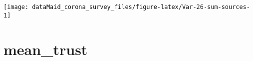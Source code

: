 \documentclass[
]{report}
\begin{document}
\begin{minipage}{0.75 \textwidth}
\end{minipage}
\begin{minipage}{0.25 \textwidth}

\begin{center}\texttt{[image: dataMaid\_corona\_survey\_files/figure-latex/Var-26-sum-sources-1]} \end{center}

\end{minipage}

\noindent\makebox[\linewidth]{\rule{\textwidth}{0.4pt}}

\hypertarget{mean_trust}{%
\section{mean\_trust}\label{mean_trust}}

\begin{minipage}{0.75 \textwidth}


\end{minipage}
\end{document}
